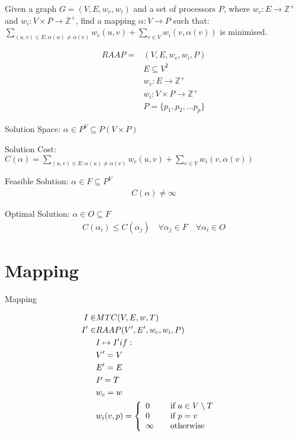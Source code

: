 \documentclass{article}
\begin{document}
\begin{definition}
Given a graph $G=(V,E,w_c,w_i)$ and a set of processors $P$, where $w_c : E \rightarrow \mathbb{Z}^+$ and $w_i : V \times P \rightarrow \mathbb{Z}^+$, find a mapping $\alpha : V \rightarrow P$ such that:
$\displaystyle\sum\limits_{(u,v) \in E : \alpha(u) \neq \alpha(v)} w_c(u,v) + \displaystyle\sum\limits_{v \in V} w_i(v, \alpha(v))$ is minimised.

\begin{align}
	\nonumber RAAP = & (V,E,w_c, w_i, P)\\
	\nonumber & E \subseteq V^2\\
	\nonumber & w_c : E \rightarrow \mathbb{Z}^+\\
	\nonumber & w_i : V \times P \rightarrow \mathbb{Z}^+\\
	\nonumber & P = \{p_1, p_2, ...p_p\}
\end{align}

Solution Space: $\alpha \in P^V \subseteq P(V \times P)$

Solution Cost: $C(\alpha) = \displaystyle\sum\limits_{(u,v) \in E : \alpha(u) \neq \alpha(v)} w_c(u,v) + \displaystyle\sum\limits_{v \in V} w_i(v, \alpha(v))$

Feasible Solution: $\alpha \in F \subseteq P^V$
\begin{align}
	\nonumber C(\alpha) \neq \infty
\end{align}

Optimal Solution: $\alpha \in O \subseteq F$
\begin{align}
	\nonumber 	C(\alpha_i) \leq C(\alpha_j) \quad \forall \alpha_j \in F \quad \forall \alpha_i \in O
\end{align}

\end{definition}

\section{Mapping}

\begin{definition}
Mapping

\begin{align}
	\nonumber I \in & MTC(V,E,w,T) &\\
	\nonumber I' \in & RAAP(V', E', w_c, w_i, P) &\\
	\nonumber & I \mapsto I' if: &\\
	\nonumber & V' = V\\
	\nonumber & E' = E\\
	\nonumber & P = T\\
	\nonumber & w_c = w\\
	\nonumber & w_i(v,p) = \mbox{$\left\{ 
		\begin{array}{l l}
			0 & \quad \mbox{if $a \in V \setminus T$}\\
			0 & \quad \mbox{if $p = v$}\\
			\infty & \quad \mbox{otherwise}\\ \end{array} \right.$}
\end{align}
\end{definition}
\end{document}
